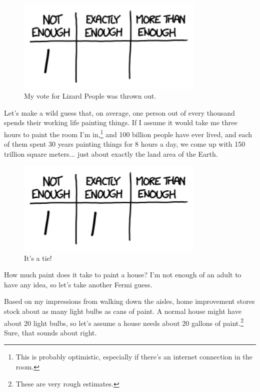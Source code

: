{\begin{figure}[!htbp]
\centering
\includegraphics[scale=0.5, max width=0.8\textwidth]{imgs/a/84/paint_vote1.png}
\caption{My vote for Lizard People was thrown out.}
\end{figure}

{Let's make a wild guess that, on average, one person out of every thousand spends their working life painting things. If I assume it would take me three hours to paint the room I'm in,{\footnote{This is probably optimistic, especially if there's an internet connection in the room.} } and 100 billion people have ever lived, and each of them spent 30 years painting things for 8 hours a day, we come up with 150 trillion square meters... just about exactly the land area of the Earth.}

\begin{figure}[!htbp]
\centering
\includegraphics[scale=0.5, max width=0.8\textwidth]{imgs/a/84/paint_vote2.png}
\caption{It's a tie!}
\end{figure}

{How much paint does it take to paint a house? I'm not enough of an adult to have any idea, so let's take another Fermi guess.}

{Based on my impressions from walking down the aisles, home improvement stores stock about as many light bulbs as cans of paint. A normal house might have about 20 light bulbs, so let's assume a house needs about 20 gallons of paint.{\footnote{These are very rough estimates.} } Sure, that sounds about right.}

}
